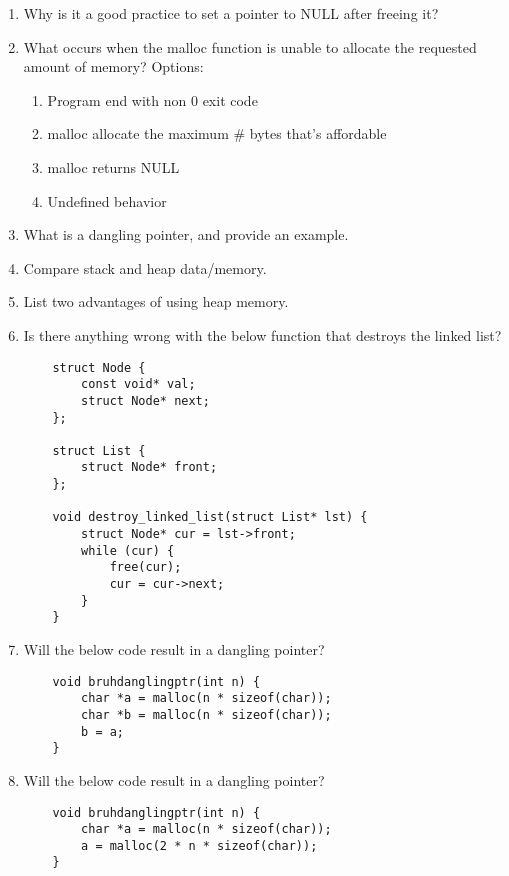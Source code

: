 \documentclass{article}
\begin{document}
\begin{enumerate}
    \item Why is it a good practice to set a pointer to NULL after freeing it?
    \vspace{16mm}
    \item What occurs when the malloc function is unable to allocate the requested amount of memory?
    Options:
    \begin{enumerate}[label=\alph*.]
        \item Program end with non 0 exit code
        \item malloc allocate the maximum \# bytes that’s affordable
        \item malloc returns NULL
        \item Undefined behavior
    \end{enumerate}
    \item What is a dangling pointer, and provide an example.
    \vspace{16mm}
    \item Compare stack and heap data/memory.
    \vspace{16mm}
    \item List two advantages of using heap memory.
    \vspace{16mm}

    \item Is there anything wrong with the below function that destroys the linked list?
    \begin{lstlisting}
    struct Node {
        const void* val;
        struct Node* next;
    };

    struct List {
        struct Node* front;
    };

    void destroy_linked_list(struct List* lst) {
        struct Node* cur = lst->front;
        while (cur) {
            free(cur);
            cur = cur->next;
        }
    }
    \end{lstlisting}
    \vspace{16mm}
    \item Will the below code result in a dangling pointer?
    \begin{lstlisting}
    void bruhdanglingptr(int n) {
        char *a = malloc(n * sizeof(char));
        char *b = malloc(n * sizeof(char));
        b = a;
    }
    \end{lstlisting}

    \item Will the below code result in a dangling pointer?
    \begin{lstlisting}
    void bruhdanglingptr(int n) {
        char *a = malloc(n * sizeof(char));
        a = malloc(2 * n * sizeof(char));
    }
    \end{lstlisting}
    

\end{enumerate}
\end{document}
